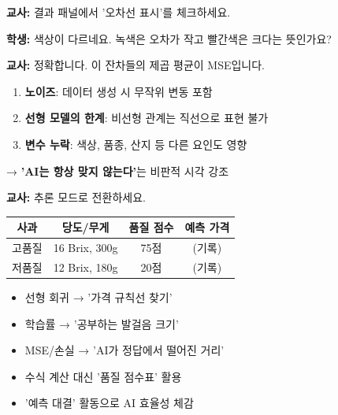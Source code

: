 \documentclass[11pt,a4paper]{article}
\begin{document}
\begin{tcolorbox}[colback=lightgray,colframe=gray,title=\textbf{【탐구 2: 오차선 분석 - 8분】}]
 \textbf{교사:} 결과 패널에서 '오차선 표시'를 체크하세요.

 \textbf{학생:} 색상이 다르네요. 녹색은 오차가 작고 빨간색은 크다는 뜻인가요?

 \textbf{교사:} 정확합니다. 이 잔차들의 제곱 평균이 MSE입니다.

\vspace{0.3cm}
\begin{tcolorbox}[colback=lightyellow,colframe=orange,title=\textbf{\texttwemoji{light bulb} 핵심 인사이트: 오차가 0이 될 수 없는 이유}]
\begin{enumerate}
    \item \textbf{노이즈}: 데이터 생성 시 무작위 변동 포함
    \item \textbf{선형 모델의 한계}: 비선형 관계는 직선으로 표현 불가
    \item \textbf{변수 누락}: 색상, 품종, 산지 등 다른 요인도 영향
\end{enumerate}
→ \textbf{'AI는 항상 맞지 않는다'}는 비판적 시각 강조
\end{tcolorbox}
\end{tcolorbox}

\begin{tcolorbox}[colback=lightgray,colframe=gray,title=\textbf{【탐구 3: 추론 실습 - 7분】}]
 \textbf{교사:}  추론 모드로 전환하세요.

\begin{center}
\begin{tabular}{|c|c|c|c|}
\hline
\textbf{사과} & \textbf{당도/무게} & \textbf{품질 점수} & \textbf{예측 가격} \\
\hline
고품질 & 16 Brix, 300g & 75점 & (기록) \\
\hline
저품질 & 12 Brix, 180g & 20점 & (기록) \\
\hline
\end{tabular}
\end{center}
\end{tcolorbox}

\begin{tcolorbox}[colback=lightgreen,colframe=applegreen,title=\textbf{【모둠 토론 - 10분】 \texttwemoji{graduation cap} 초등학생 대상 교수 전략}]
\begin{itemize}
    \item 선형 회귀 → '가격 규칙선 찾기'
    \item 학습률 → '공부하는 발걸음 크기'
    \item MSE/손실 → 'AI가 정답에서 떨어진 거리'
    \item 수식 계산 대신 '품질 점수표' 활용
    \item '예측 대결' 활동으로 AI 효율성 체감
\end{itemize}
\end{tcolorbox}
\end{document}
